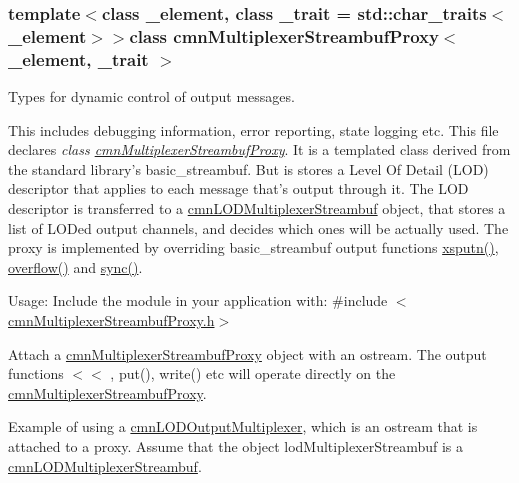 \subsubsection*{template$<$class \-\_\-element, class \-\_\-trait = std\-::char\-\_\-traits$<$\-\_\-element$>$$>$class cmn\-Multiplexer\-Streambuf\-Proxy$<$ \-\_\-element, \-\_\-trait $>$}

Types for dynamic control of output messages. 

This includes debugging information, error reporting, state logging etc. This file declares {\itshape class \hyperlink{classcmn_multiplexer_streambuf_proxy}{cmn\-Multiplexer\-Streambuf\-Proxy}}. It is a templated class derived from the standard library's basic\-\_\-streambuf. But is stores a Level Of Detail (L\-O\-D) descriptor that applies to each message that's output through it. The L\-O\-D descriptor is transferred to a \hyperlink{classcmn_l_o_d_multiplexer_streambuf}{cmn\-L\-O\-D\-Multiplexer\-Streambuf} object, that stores a list of L\-O\-Ded output channels, and decides which ones will be actually used. The proxy is implemented by overriding basic\-\_\-streambuf output functions \hyperlink{classcmn_multiplexer_streambuf_proxy_a43ad7db2163d7cc48b55be06686d285a}{xsputn()}, \hyperlink{classcmn_multiplexer_streambuf_proxy_a10a4e0b433962e191fcbff9b8238ed99}{overflow()} and \hyperlink{classcmn_multiplexer_streambuf_proxy_a7e7755a46401f3d10e6c1f2100af0a4d}{sync()}.

Usage\-: Include the module in your application with\-: \#include $<$\hyperlink{cmn_multiplexer_streambuf_proxy_8h}{cmn\-Multiplexer\-Streambuf\-Proxy.\-h}$>$

Attach a \hyperlink{classcmn_multiplexer_streambuf_proxy}{cmn\-Multiplexer\-Streambuf\-Proxy} object with an ostream. The output functions $<$$<$ , put(), write() etc will operate directly on the \hyperlink{classcmn_multiplexer_streambuf_proxy}{cmn\-Multiplexer\-Streambuf\-Proxy}.

Example of using a \hyperlink{classcmn_l_o_d_output_multiplexer}{cmn\-L\-O\-D\-Output\-Multiplexer}, which is an ostream that is attached to a proxy. Assume that the object lod\-Multiplexer\-Streambuf is a \hyperlink{classcmn_l_o_d_multiplexer_streambuf}{cmn\-L\-O\-D\-Multiplexer\-Streambuf}.


